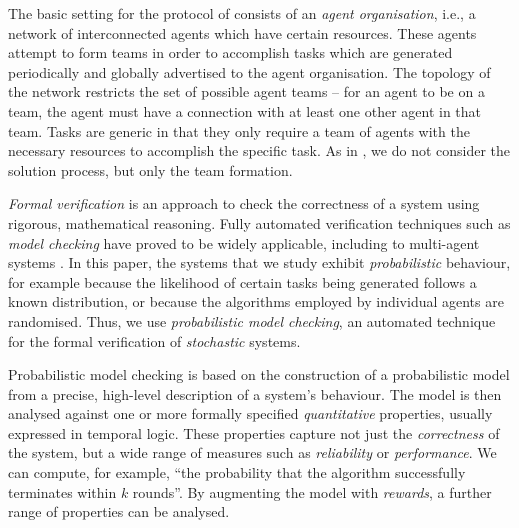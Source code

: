 \documentclass{llncs}
\begin{document}
The basic setting for the protocol of \cite{gaston2005agent} consists of an \emph{agent organisation}, i.e., a network of interconnected agents which have certain resources. These agents attempt to form teams in order to accomplish tasks which are generated periodically and globally advertised to the agent organisation. The topology of the network restricts the set of possible agent teams -- for an agent to be on a team, the agent must have a connection with at least one other agent in that team. Tasks are generic in that they only require a team of agents with the necessary resources to accomplish the specific task. As in \cite{gaston2005agent}, we do not consider the solution process, but only the team formation.

\emph{Formal verification} is an approach to check the correctness of a system
using rigorous, mathematical reasoning.
Fully automated verification techniques such as \emph{model checking}
have proved to be widely applicable,
including to multi-agent systems \cite{lomuscio2006mcmas}.
In this paper, the systems that we study exhibit \emph{probabilistic} behaviour,
for example because the likelihood of certain tasks being generated follows a known distribution,
or because the algorithms employed by individual agents are randomised.
Thus, we use \emph{probabilistic model checking}, an automated technique for
the formal verification of \emph{stochastic} systems.


Probabilistic model checking is based
on the construction of a probabilistic model from a precise,
high-level description of a system's behaviour.
The model is then analysed against one or more formally specified \emph{quantitative} properties,
usually expressed in temporal logic.
These properties capture not just the \emph{correctness} of the system,
but a wide range of measures such as \emph{reliability} or \emph{performance}.
We can compute, for example, ``the probability that the algorithm successfully terminates within $k$ rounds''.
By augmenting the model with \emph{rewards}, a further range of properties can be analysed.
\end{document}
